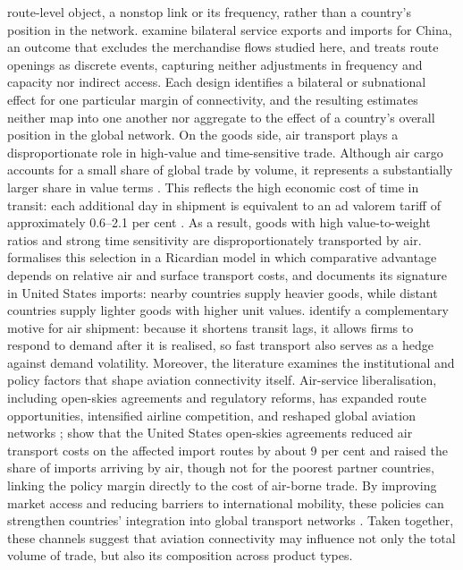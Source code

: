 route-level object, a nonstop link or its frequency, rather than a
country's position in the network. \citet{Oum_2024} examine bilateral
service exports and imports for China, an outcome that excludes the
merchandise flows studied here, and \citet{Jiang_2026} treats route openings
as discrete events, capturing neither adjustments in frequency and capacity
nor indirect access. Each design
identifies a bilateral or subnational effect for one particular margin of
connectivity, and the resulting estimates neither map into one another nor
aggregate to the effect of a country's overall position in the global
network. On the goods side, air transport
plays a disproportionate role in high-value and time-sensitive trade.
Although air cargo accounts for a small share of global trade by volume, it
represents a substantially larger share in value terms \citep{IATA_cargo}.
This reflects the high economic cost of time in transit: each additional day
in shipment is equivalent to an ad valorem tariff of approximately 0.6--2.1
per cent \citep{Hummels_2013}. As a result, goods with high value-to-weight
ratios and strong time sensitivity are disproportionately transported by air.
\citet{Harrigan_2010} formalises this selection in a Ricardian model in
which comparative advantage depends on relative air and surface transport
costs, and documents its signature in United States imports: nearby
countries supply heavier goods, while distant countries supply lighter
goods with higher unit values. \citet{Hummels_2010} identify a
complementary motive for air shipment: because it shortens transit lags,
it allows firms to respond to demand after it is realised, so fast
transport also serves as a hedge against demand volatility.
Moreover, the literature examines the institutional and policy factors that
shape aviation connectivity itself. Air-service liberalisation, including
open-skies agreements and regulatory reforms, has expanded route
opportunities, intensified airline competition, and reshaped global aviation
networks \citep{Adler_2014}; \citet{Micco_2006} show that the United States
open-skies agreements reduced air transport costs on the affected import
routes by about 9 per cent and raised the share of imports arriving by air,
though not for the poorest partner countries, linking the policy margin
directly to the cost of air-borne trade. By improving market access and reducing barriers
to international mobility, these policies can strengthen countries'
integration into global transport networks \citep{Burghouwt_2015}. Taken
together, these channels suggest that aviation connectivity may influence not
only the total volume of trade, but also its composition across product
types.

